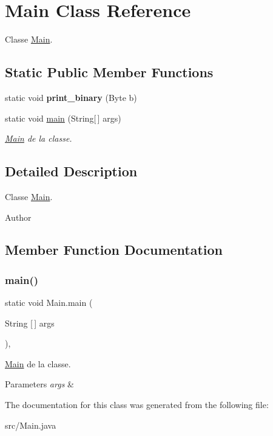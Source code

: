 \hypertarget{classMain}{}\section{Main Class Reference}
\label{classMain}


Classe \hyperlink{classMain}{Main}.  


\subsection*{Static Public Member Functions}
\begin{DoxyCompactItemize}
\item 
\mbox{\label{classMain_a69badac3fc1a17002a789d4b3c217031}} 
static void {\bfseries print\+\_\+binary} (Byte b)
\item 
static void \hyperlink{classMain_a8a5d0f827edddff706cc0e6740d0579a}{main} (String\mbox{[}$\,$\mbox{]} args)
\begin{DoxyCompactList}\small\item\em \hyperlink{classMain}{Main} de la classe. \end{DoxyCompactList}\end{DoxyCompactItemize}


\subsection{Detailed Description}
Classe \hyperlink{classMain}{Main}. 

\begin{DoxyAuthor}{Author}

\end{DoxyAuthor}


\subsection{Member Function Documentation}
\mbox{\label{classMain_a8a5d0f827edddff706cc0e6740d0579a}} 
\subsubsection{\texorpdfstring{main()}{main()}}
{\footnotesize\ttfamily static void Main.\+main (\begin{DoxyParamCaption}\item[{String \mbox{[}$\,$\mbox{]}}]{args }\end{DoxyParamCaption})\hspace{0.3cm}{\ttfamily [inline]}, {\ttfamily [static]}}



\hyperlink{classMain}{Main} de la classe. 


\begin{DoxyParams}{Parameters}
{\em args} & \\
\hline
\end{DoxyParams}


The documentation for this class was generated from the following file\+:\begin{DoxyCompactItemize}
\item 
src/Main.\+java\end{DoxyCompactItemize}
